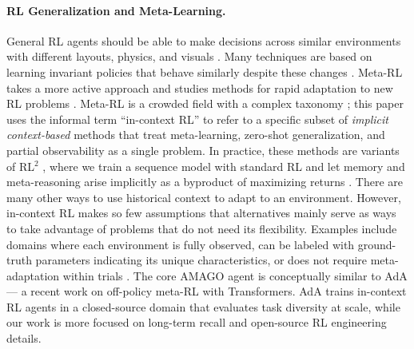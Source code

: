\documentclass{article}
\begin{document}
\paragraph{RL Generalization and Meta-Learning.} General RL agents should be able to make decisions across similar environments with different layouts, physics, and visuals \cite{cobbe2020leveraging, song2019observational, packer2018assessing, zhang2018dissection}. Many techniques are based on learning invariant policies that behave similarly despite these changes \cite{kirk2022survey}. Meta-RL takes a more active approach and studies methods for rapid adaptation to new RL problems \cite{schmidhuber1987evolutionary}. Meta-RL is a crowded field with a complex taxonomy \cite{beck2023survey}; this paper uses the informal term ``in-context RL'' to refer to a specific subset of \textit{implicit context-based} methods that treat meta-learning, zero-shot generalization, and partial observability as a single problem. In practice, these methods are variants of RL$^2$ \cite{duan2016rl, wang2016learning}, where we train a sequence model with standard RL and let memory and meta-reasoning arise implicitly as a byproduct of maximizing returns \cite{botvinick2019reinforcement, mishra2017simple, stadie2018some, ni2022recurrent, ortega2019meta, fakoor2019meta, team2023human}. There are many other ways to use historical context to adapt to an environment. However, in-context RL makes so few assumptions that alternatives mainly serve as ways to take advantage of problems that do not need its flexibility. Examples include domains where each environment is fully observed, can be labeled with ground-truth parameters indicating its unique characteristics, or does not require meta-adaptation within trials \cite{humplik2019meta, kamienny2020learning, liu2021decoupling, rakelly2019efficient, ren2020ocean, wang2021improving}.
The core AMAGO agent is conceptually similar to AdA \cite{team2023human} --- a recent work on off-policy meta-RL with Transformers. AdA trains in-context RL agents in a closed-source domain that evaluates task diversity at scale, while our work is more focused on long-term recall and open-source RL engineering details.
\vspace{-2mm}
\end{document}
